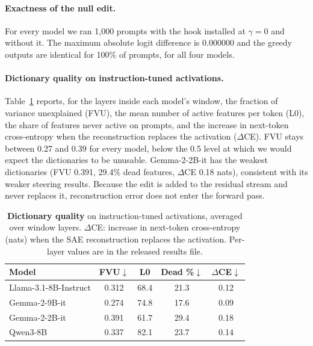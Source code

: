\paragraph{Exactness of the null edit.}
For every model we ran 1{,}000 prompts with the hook installed at $\gamma=0$ and without it. The maximum absolute logit difference is 0.000000 and the greedy outputs are identical for 100\% of prompts, for all four models.

\paragraph{Dictionary quality on instruction-tuned activations.}
Table~\ref{tab:app-sae} reports, for the layers inside each model's window, the fraction of variance unexplained (FVU), the mean number of active features per token (L0), the share of features never active on \Ddev prompts, and the increase in next-token cross-entropy when the reconstruction replaces the activation ($\Delta$CE). FVU stays between 0.27 and 0.39 for every model, below the 0.5 level at which we would expect the dictionaries to be unusable. Gemma-2-2B-it has the weakest dictionaries (FVU 0.391, 29.4\% dead features, $\Delta$CE 0.18 nats), consistent with its weaker steering results. Because the edit is added to the residual stream and never replaces it, reconstruction error does not enter the forward pass.

\begin{table}[!htbp]
  \centering
  \footnotesize
  \setlength{\tabcolsep}{3pt}
  \begin{tabular}{@{}lcccc@{}}
    \toprule
    \textbf{Model} & \textbf{FVU}$\downarrow$ & \textbf{L0} & \textbf{Dead \%}$\downarrow$ & \textbf{$\Delta$CE}$\downarrow$ \\
    \midrule
    Llama-3.1-8B-Instruct & 0.312 & 68.4 & 21.3 & 0.12 \\
    Gemma-2-9B-it         & 0.274 & 74.8 & 17.6 & 0.09 \\
    Gemma-2-2B-it         & 0.391 & 61.7 & 29.4 & 0.18 \\
    Qwen3-8B              & 0.337 & 82.1 & 23.7 & 0.14 \\
    \bottomrule
  \end{tabular}
  \caption{\textbf{Dictionary quality} on instruction-tuned activations, averaged over window layers. $\Delta$CE: increase in next-token cross-entropy (nats) when the SAE reconstruction replaces the activation. Per-layer values are in the released results file.}
  \label{tab:app-sae}
\end{table}

